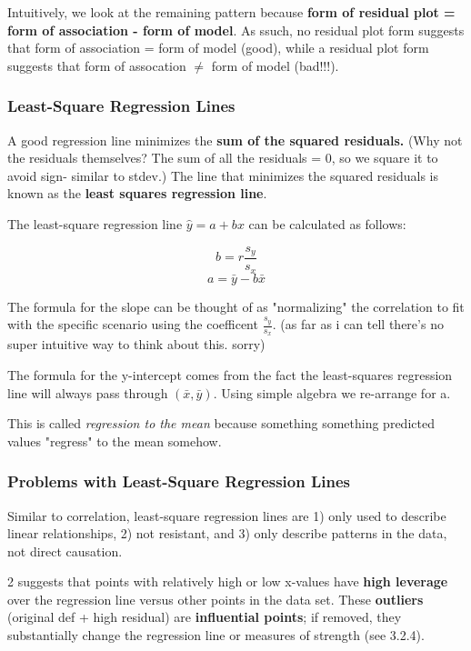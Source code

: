 \documentclass[12pt, a4paper]{article}
\theoremstyle{definition}
\begin{document}
Intuitively, we look at the remaining pattern because \textbf{form of residual plot = form of association - form of model}.
As ssuch, no residual plot form suggests that form of association = form of model (good), while a residual plot form suggests that form of assocation $\neq$ form of model (bad!!!).

\subsubsection{Least-Square Regression Lines}

A good regression line minimizes the \textbf{sum of the squared residuals.} (Why not the residuals themselves? The sum of all the residuals = 0, so we square it to avoid sign- similar to stdev.)
The line that minimizes the squared residuals is known as the \textbf{least squares regression line}.

The least-square regression line $\hat{y} = a + bx$ can be calculated as follows:

\[b = r\frac{s_y}{s_x}\]
\[a = \bar{y} - b \bar{x}\]

The formula for the slope can be thought of as "normalizing" the correlation to fit with the specific scenario using the coefficent $\frac{s_y}{s_x}$.
(as far as i can tell there's no super intuitive way to think about this. sorry)

The formula for the y-intercept comes from the fact the least-squares regression line will always pass through $(\bar{x}, \bar{y})$. Using simple algebra we re-arrange for a.

This is called \textit{regression to the mean} because something something predicted values "regress" to the mean somehow.

\subsubsection{Problems with Least-Square Regression Lines}
Similar to correlation, least-square regression lines are 1) only used to describe linear relationships, 2) not resistant, and 3) only describe patterns in the data, not direct causation.

2 suggests that points with relatively high or low x-values have \textbf{high leverage} over the regression line versus other points in the data set.
These \textbf{outliers} (original def + high residual) are \textbf{influential points}; if removed, they substantially change the regression line or measures of strength (see 3.2.4).
\end{document}
